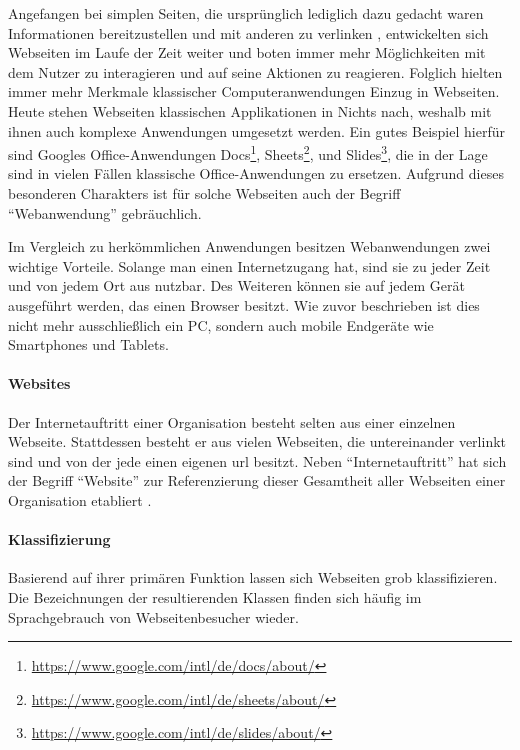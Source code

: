             Angefangen bei simplen Seiten,
            die ursprünglich lediglich dazu gedacht waren Informationen
            bereitzustellen und mit anderen zu
            verlinken \cite{bernersLee:InformationManagement},
            entwickelten sich Webseiten im Laufe der Zeit weiter
            und boten immer mehr Möglichkeiten mit dem Nutzer zu interagieren
            und auf seine Aktionen zu reagieren.
            Folglich hielten immer mehr Merkmale klassischer Computeranwendungen
            Einzug in Webseiten.
            Heute stehen Webseiten klassischen Applikationen in Nichts nach,
            weshalb mit ihnen auch komplexe Anwendungen umgesetzt werden.
            Ein gutes Beispiel hierfür sind Googles Office-Anwendungen
            Docs\footnote{\url{https://www.google.com/intl/de/docs/about/}},
            Sheets\footnote{\url{https://www.google.com/intl/de/sheets/about/}},
            und Slides\footnote{\url{https://www.google.com/intl/de/slides/about/}},
            die in der Lage sind in vielen Fällen klassische Office-Anwendungen zu ersetzen.
            Aufgrund dieses besonderen Charakters ist für solche Webseiten auch der Begriff
            "`Webanwendung"' gebräuchlich.

            Im Vergleich zu herkömmlichen Anwendungen besitzen Webanwendungen zwei wichtige Vorteile.
            Solange man einen Internetzugang hat, sind sie zu jeder Zeit und von jedem Ort aus nutzbar.
            Des Weiteren können sie auf jedem Gerät ausgeführt werden,
            das einen Browser besitzt. Wie zuvor beschrieben ist dies nicht mehr ausschließlich ein PC,
            sondern auch mobile Endgeräte wie Smartphones und Tablets.

            \paragraph*{Websites}
            Der Internetauftritt einer Organisation besteht selten aus einer
            einzelnen Webseite.
            Stattdessen besteht er aus vielen Webseiten,
            die untereinander verlinkt sind und von der jede einen eigenen
            \gls{url} besitzt.
            Neben "`Internetauftritt"' hat sich der Begriff "`Website"' zur
            Referenzierung dieser Gesamtheit aller Webseiten einer Organisation
            etabliert \cite{duden:Internetauftritt, oxford:Website}.

            \paragraph*{Klassifizierung}
            Basierend auf ihrer primären Funktion lassen sich Webseiten grob klassifizieren.
            Die Bezeichnungen der resultierenden Klassen finden sich häufig im Sprachgebrauch
            von Webseitenbesucher wieder.

